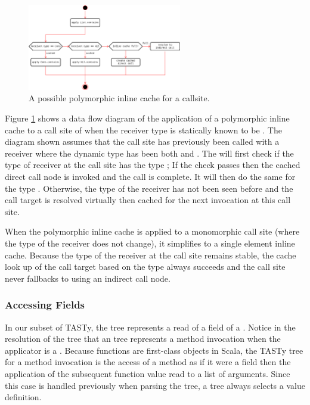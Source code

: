 \begin{figure}[!htb]
	\centering
	\includegraphics[width=0.6\textwidth]{figures/tastytruffle-pic-example.png}
	\caption{A possible polymorphic inline cache for a  callsite.}
	\label{example:poly-cache-call-node}
\end{figure}

Figure \ref{example:poly-cache-call-node} shows a data flow diagram of the application of a polymorphic inline cache to a call site of  when the receiver type is statically known to be . 
The diagram shown assumes that the call site has previously been called with a receiver where the dynamic type has been both  and .
The  will first check if the type of receiver at the call site has the type ; If the check passes then the cached direct call node is invoked and the call is complete.
It will then do the same for the type .
Otherwise, the type of the receiver has not been seen before and the call target is resolved virtually then cached for the next invocation at this call site.

When the polymorphic inline cache is applied to a monomorphic call site (where the type of the receiver does not change), it simplifies to a single element inline cache\cite{smalltalk:inline-caches}. 
Because the type of the receiver at the call site remains stable, the cache look up of the call target based on the type always succeeds and the call site never fallbacks to using an indirect call node.

\subsubsection*{Accessing Fields}

In our subset of TASTy, the  tree represents a read of a field of a .
Notice in the resolution of the  tree that an  tree represents a method invocation when the applicator is a .
Because functions are first-class objects in Scala, the TASTy tree for a method invocation is the access of a method as if it were a field then the application of the subsequent function value read to a list of arguments.
Since this case is handled previously when parsing the  tree, a  tree always selects a value definition.

